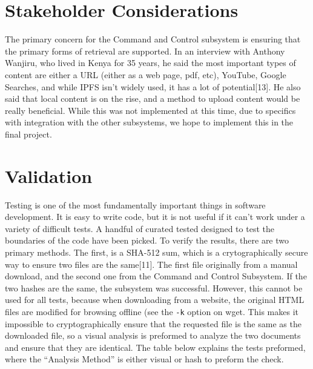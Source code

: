 \documentclass{article}
\begin{document}
\section{Stakeholder Considerations}

The primary concern for the Command and Control subsystem is ensuring
that the primary forms of retrieval are supported. In an interview with
Anthony Wanjiru, who lived in Kenya for 35 years, he said the most
important types of content are either a URL (either as a web page,
pdf, etc), YouTube, Google Searches, and while IPFS isn't widely used,
it has a lot of potential[13]. He also said that local content is on
the rise, and a method to upload content would be really
beneficial. While this was not implemented at this time, due to
specifics with integration with the other subsystems, we hope to
implement this in the final project.

\section{Validation}

Testing is one of the most fundamentally important things in software
development. It is easy to write code, but it is not useful if it
can't work under a variety of difficult tests. A handful of curated
tested designed to test the boundaries of the code have been
picked. To verify the results, there are two primary methods. The
first, is a SHA-512 sum, which is a crytographically secure way to
ensure two files are the same[11]. The first file originally from a
manual download, and the second one from the Command and Control
Subsystem. If the two hashes are the same, the subsystem was
successful. However, this cannot be used for all
tests, because when downloading from a website, the original HTML files
are modified for browsing offline (see the \texttt{-k} option on
wget. This makes it impossible to cryptographically ensure that the
requested file is the same as the downloaded file, so a visual
analysis is preformed to analyze the two documents and ensure that
they are identical. The table below explains the tests preformed,
where the ``Analysis Method'' is either visual or hash to preform the
check. 
\end{document}
